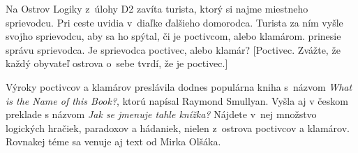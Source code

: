{Na Ostrov Logiky z~úlohy D2 zavíta turista, ktorý si najme
miestneho sprievodcu. Pri ceste uvidia v~diaľke ďalšieho domorodca.
Turista za ním vyšle svojho sprievodcu, aby sa ho spýtal, či je
poctivcom, alebo klamárom.  prinesie
správu sprievodca. Je sprievodca poctivec, alebo klamár?
[Poctivec. Zvážte, že každý obyvateľ ostrova o~sebe tvrdí, že je
poctivec.]

{\everypar{}

\smallskip
Výroky poctivcov a klamárov preslávila dodnes
populárna kniha s~názvom \emph{What is the Name of this Book?},
ktorú napísal Raymond Smullyan. Vyšla aj v českom preklade s názvom \emph{Jak se jmenuje tahle knížka?} Nájdete v~nej množstvo logických
hračiek, paradoxov a hádaniek, nielen z~ostrova poctivcov a klamárov.
Rovnakej téme sa venuje aj text
 od Mirka Olšáka.
}

}

